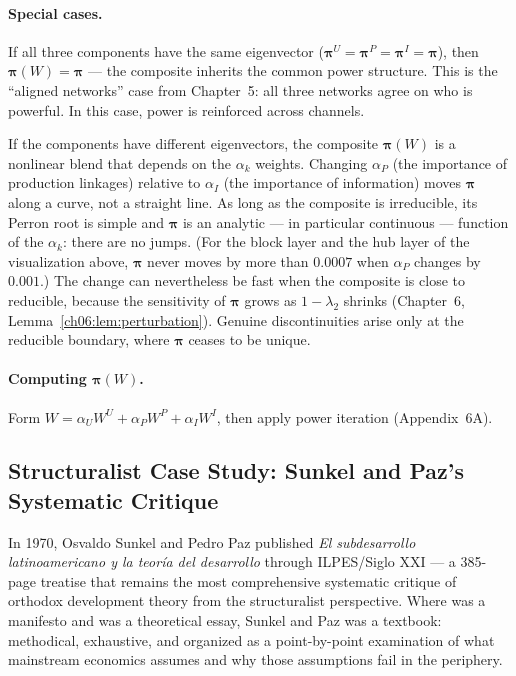 \documentclass[../structural_economics_book.tex]{subfiles}
\begin{document}
\paragraph{Special cases.} If all three components have the same eigenvector ($\boldsymbol{\pi}^U = \boldsymbol{\pi}^P = \boldsymbol{\pi}^I = \boldsymbol{\pi}$), then $\boldsymbol{\pi}(W) = \boldsymbol{\pi}$ --- the composite inherits the common power structure. This is the ``aligned networks'' case from Chapter~5: all three networks agree on who is powerful. In this case, power is reinforced across channels.

If the components have different eigenvectors, the composite $\boldsymbol{\pi}(W)$ is a nonlinear blend that depends on the $\alpha_k$ weights. Changing $\alpha_P$ (the importance of production linkages) relative to $\alpha_I$ (the importance of information) moves $\boldsymbol{\pi}$ along a curve, not a straight line. As long as the composite is irreducible, its Perron root is simple and $\boldsymbol{\pi}$ is an analytic --- in particular continuous --- function of the $\alpha_k$: there are no jumps. (For the block layer and the hub layer of the visualization above, $\boldsymbol{\pi}$ never moves by more than $0.0007$ when $\alpha_P$ changes by $0.001$.) The change can nevertheless be fast when the composite is close to reducible, because the sensitivity of $\boldsymbol{\pi}$ grows as $1 - \lambda_2$ shrinks (Chapter~6, Lemma~\ref{ch06:lem:perturbation}). Genuine discontinuities arise only at the reducible boundary, where $\boldsymbol{\pi}$ ceases to be unique.

\paragraph{Computing $\boldsymbol{\pi}(W)$.} Form $W = \alpha_U W^U + \alpha_P W^P + \alpha_I W^I$, then apply power iteration (Appendix~6A).


\subsection*{Structuralist Case Study: Sunkel and Paz's Systematic Critique}

In 1970, Osvaldo Sunkel and Pedro Paz published \textit{El subdesarrollo latinoamericano y la teor\'{i}a del desarrollo} through ILPES/Siglo XXI --- a 385-page treatise that remains the most comprehensive systematic critique of orthodox development theory from the structuralist perspective. Where \citet{prebisch1949desarrollo} was a manifesto and \citet{furtado1961desenvolvimento} was a theoretical essay, Sunkel and Paz was a textbook: methodical, exhaustive, and organized as a point-by-point examination of what mainstream economics assumes and why those assumptions fail in the periphery.
\end{document}
